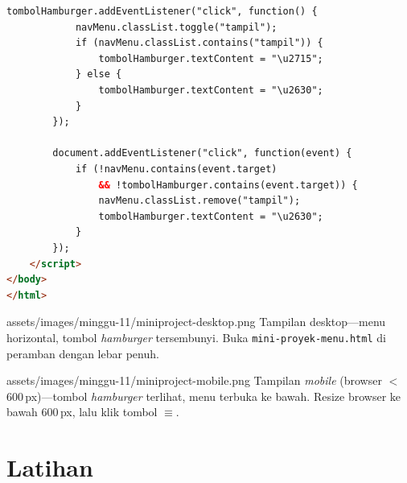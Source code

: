 \begin{lstlisting}[language=HTML, caption={Mini proyek: toggle menu mobile}, label={lst:11-toggle-menu}]
        tombolHamburger.addEventListener("click", function() {
            navMenu.classList.toggle("tampil");
            if (navMenu.classList.contains("tampil")) {
                tombolHamburger.textContent = "\u2715";
            } else {
                tombolHamburger.textContent = "\u2630";
            }
        });

        document.addEventListener("click", function(event) {
            if (!navMenu.contains(event.target)
                && !tombolHamburger.contains(event.target)) {
                navMenu.classList.remove("tampil");
                tombolHamburger.textContent = "\u2630";
            }
        });
    </script>
</body>
</html>
\end{lstlisting}

\begin{tangkapanlayar}
  {assets/images/minggu-11/miniproject-desktop.png}
  {Tampilan desktop---menu horizontal, tombol \emph{hamburger} tersembunyi.}
  {Buka \texttt{mini-proyek-menu.html} di peramban dengan lebar penuh.}
\end{tangkapanlayar}

\begin{tangkapanlayar}
  {assets/images/minggu-11/miniproject-mobile.png}
  {Tampilan \emph{mobile} (browser $<$ 600\,px)---tombol \emph{hamburger} terlihat, menu terbuka ke bawah.}
  {Resize browser ke bawah 600\,px, lalu klik tombol $\equiv$.}
\end{tangkapanlayar}

\section{Latihan}
\label{sec:11-latihan}

